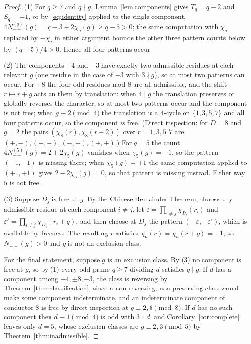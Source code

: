 \documentclass[11pt,reqno]{amsart}
\theoremstyle{plain}
\theoremstyle{definition}
\begin{document}
\begin{proof}
(1) For $q \ge 7$ and $q \nmid g$, Lemma~\ref{lem:components} gives
$T_q = q - 2$ and $S_q = -1$, so by~\eqref{eq:identity} applied to the single
component, $4 N^{(q)}_{--}(g) = q - 3 + 2\chi_q(g) \ge q - 5 > 0$; the same
computation with $\chi_q$ replaced by $-\chi_q$ in either argument bounds the
other three pattern counts below by $(q-5)/4 > 0$. Hence all four patterns
occur.

(2) The components $-4$ and $-3$ have exactly two admissible residues at each
relevant $g$ (one residue in the case of $-3$ with $3 \nmid g$), so at most two
patterns can occur. For $\pm 8$ the four odd residues mod $8$ are all
admissible, and the shift $r \mapsto r + g$ acts on them by translation: when
$4 \mid g$ the translation preserves or globally reverses the character, so at
most two patterns occur and the component is not free; when
$g \equiv 2 \pmod 4$ the translation is a $4$-cycle on $\{1,3,5,7\}$ and all
four patterns occur, so the component \emph{is} free. (Direct inspection: for
$D = 8$ and $g = 2$ the pairs $(\chi_8(r), \chi_8(r+2))$ over
$r = 1,3,5,7$ are $(+,-), (-,-), (-,+), (+,+)$.) For $q = 5$ the count
$4N^{(5)}_{--}(g) = 2 + 2\chi_5(g)$ vanishes when $\chi_5(g) = -1$, so the
pattern $(-1,-1)$ is missing there; when $\chi_5(g) = +1$ the same computation
applied to $(+1,+1)$ gives $2 - 2\chi_5(g) = 0$, so that pattern is missing
instead. Either way $5$ is not free.

(3) Suppose $D_j$ is free at $g$. By the Chinese Remainder Theorem, choose any
admissible residue at each component $i \neq j$, let
$\varepsilon = \prod_{i \neq j} \chi_{D_i}(r_i)$ and
$\varepsilon' = \prod_{i \neq j} \chi_{D_i}(r_i + g)$, and then choose at $D_j$
the pattern $(-\varepsilon, -\varepsilon')$, which is available by freeness.
The resulting $r$ satisfies $\chi_a(r) = \chi_a(r+g) = -1$, so
$N_{--}(g) > 0$ and $g$ is not an exclusion class.

For the final statement, suppose $g$ is an exclusion class. By (3) no component
is free at $g$, so by (1) every odd prime $q \ge 7$ dividing $d$ satisfies
$q \mid g$. If $d$ has a component among $-4, \pm 8, -3$, the class is
reversing by Theorem~\ref{thm:classification}, since a non-reversing,
non-preserving class would make some component indeterminate, and an
indeterminate component of conductor $8$ is free by direct inspection at
$g \equiv 2, 6 \pmod 8$. If $d$ has no such component then $d \equiv 1 \pmod 4$
is odd with $3 \nmid d$, and Corollary~\ref{cor:complete} leaves only $d = 5$,
whose exclusion classes are $g \equiv 2, 3 \pmod 5$ by
Theorem~\ref{thm:inadmissible}.
\end{proof}
\end{document}
